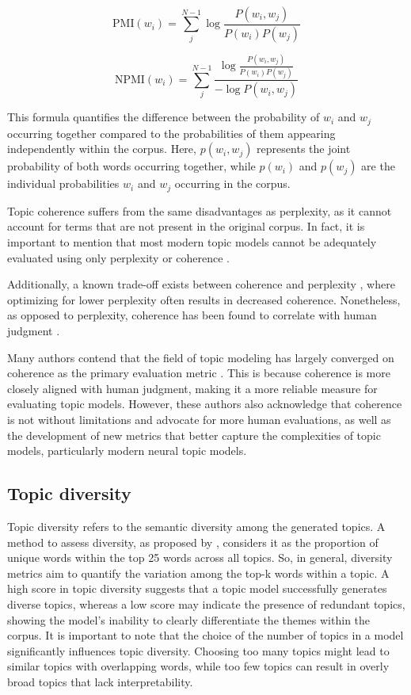 \[
\text{PMI}(w_i) = \sum_{j}^{N-1} \log \frac{P(w_i, w_j)}{P(w_i) P(w_j)}
\]

\[
\text{NPMI}(w_i) = \sum_{j}^{N-1} \frac{\log \frac{P(w_i, w_j)}{P(w_i) P(w_j)}}{-\log P(w_i, w_j)}
\]

This formula quantifies the difference between the probability of $w_i$ and $w_j$ occurring together compared to the probabilities of them appearing independently within the corpus. Here, $p(w_i,w_j)$ represents the joint probability of both words occurring together, while $p(w_i)$ and $p(w_j)$ are the individual probabilities $w_i$ and $w_j$ occurring in the corpus.

Topic coherence suffers from the same disadvantages as perplexity, as it cannot account for terms that are not present in the original corpus. In fact, it is important to mention that most modern topic models cannot be adequately evaluated using only perplexity or coherence \cite{doogan_topic_2021, hoyle_is_2021}.

Additionally, a known trade-off exists between coherence and perplexity \cite{chang_reading_2009}, where optimizing for lower perplexity often results in decreased coherence. Nonetheless, as opposed to perplexity, coherence has been found to correlate with human judgment \cite{doogan_topic_2021, hoyle_is_2021, lee_human_2017, newman_evaluating_2010, mimno_optimizing_nodate, lau_machine_2014}.

Many authors contend that the field of topic modeling has largely converged on coherence as the primary evaluation metric \cite{doogan_topic_2021, hoyle_is_2021, mimno_optimizing_nodate, lau_machine_2014}. This is because coherence is more closely aligned with human judgment, making it a more reliable measure for evaluating topic models. However, these authors also acknowledge that coherence is not without limitations and advocate for more human evaluations, as well as the development of new metrics that better capture the complexities of topic models, particularly modern neural topic models.

\subsection{Topic diversity}
\label{sec:topic_diversity}
Topic diversity refers to the semantic diversity among the generated topics. A method to assess diversity, as proposed by \citet{dieng_topic_2020}, considers it as the proportion of unique words within the top 25 words across all topics. So, in general, diversity metrics aim to quantify the variation among the top-k words within a topic. A high score in topic diversity suggests that a topic model successfully generates diverse topics, whereas a low score may indicate the presence of redundant topics, showing the model's inability to clearly differentiate the themes within the corpus. It is important to note that the choice of the number of topics in a model significantly influences topic diversity. Choosing too many topics might lead to similar topics with overlapping words, while too few topics can result in overly broad topics that lack interpretability.

